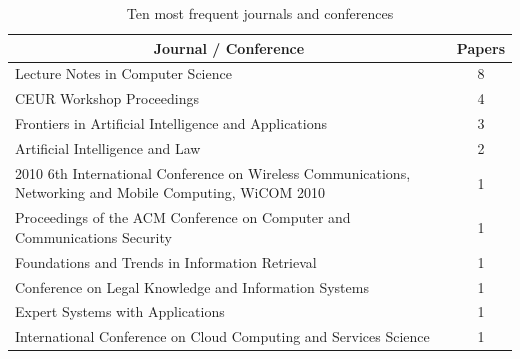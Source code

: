 
\begin{table}[H]
    \centering
    \caption{Ten most frequent journals and conferences}
    \label{tab:rsl_freq_conferences}
\begin{tabular}{@{}p{14cm}c@{}}
\toprule
\multicolumn{1}{c}{\textbf{Journal / Conference}}                                                         & \textbf{Papers} \\ \midrule
Lecture Notes in Computer Science                                                                         & 8               \\
CEUR Workshop Proceedings                                                                                 & 4               \\
Frontiers in Artificial Intelligence and Applications                                                     & 3               \\
Artificial Intelligence and Law                                                                           & 2               \\
2010 6th International Conference on Wireless Communications, Networking and Mobile Computing, WiCOM 2010 & 1               \\
Proceedings of the ACM Conference on Computer and Communications Security                                 & 1               \\
Foundations and Trends in Information Retrieval                                                           & 1               \\
Conference on Legal Knowledge and Information Systems                                                     & 1               \\
Expert Systems with Applications                                                                          & 1               \\
International Conference on Cloud Computing and Services Science                                          & 1               \\ \bottomrule
\end{tabular}
\end{table}



